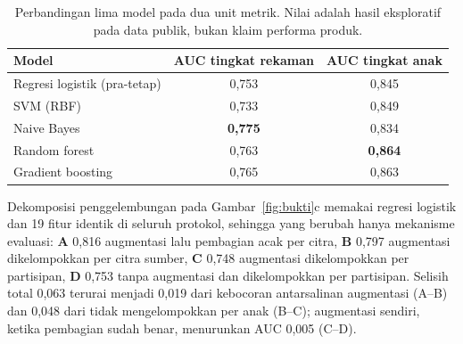 \documentclass[10pt,letterpaper]{article}
\begin{document}
\begin{table}[H]
\centering
\small
\caption{Perbandingan lima model pada dua unit metrik. Nilai adalah hasil eksploratif pada
data publik, bukan klaim performa produk.}
\label{tab:model}
\begin{tabular}{@{}lcc@{}}
\toprule
\textbf{Model} & \textbf{AUC tingkat rekaman} & \textbf{AUC tingkat anak} \\
\midrule
Regresi logistik (pra-tetap) & 0,753 & 0,845 \\
SVM (RBF) & 0,733 & 0,849 \\
Naive Bayes & \textbf{0,775} & 0,834 \\
Random forest & 0,763 & \textbf{0,864} \\
Gradient boosting & 0,765 & 0,863 \\
\bottomrule
\end{tabular}
\end{table}

Dekomposisi penggelembungan pada Gambar~\ref{fig:bukti}c memakai regresi logistik dan 19
fitur identik di seluruh protokol, sehingga yang berubah hanya mekanisme evaluasi: \textbf{A}
0,816 augmentasi lalu pembagian acak per citra, \textbf{B} 0,797 augmentasi dikelompokkan per
citra sumber, \textbf{C} 0,748 augmentasi dikelompokkan per partisipan, \textbf{D} 0,753 tanpa
augmentasi dan dikelompokkan per partisipan. Selisih total 0,063 terurai menjadi 0,019 dari
kebocoran antarsalinan augmentasi (A--B) dan 0,048 dari tidak mengelompokkan per anak (B--C);
augmentasi sendiri, ketika pembagian sudah benar, menurunkan AUC 0,005 (C--D).
\end{document}

